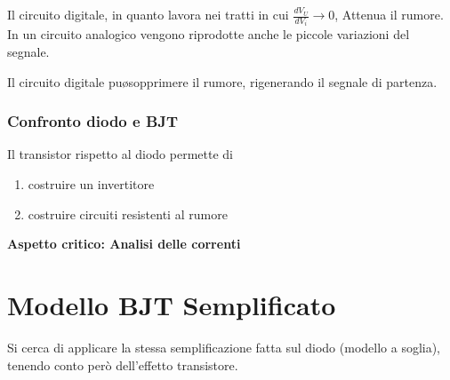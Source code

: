 \documentclass{article}
\begin{document}
Il circuito digitale, in quanto lavora nei tratti in cui $\frac{dV_U}{dV_i} \to 0$,  Attenua il rumore.
In un circuito analogico vengono riprodotte anche le piccole variazioni del segnale.


Il circuito digitale pu\o sopprimere il rumore, rigenerando il segnale di partenza.

\subsubsection{Confronto diodo e BJT}
Il transistor rispetto al diodo permette di
\begin{enumerate}
    \item costruire un invertitore
    \item costruire circuiti resistenti al rumore
\end{enumerate}

\textbf{Aspetto critico: Analisi delle correnti}

\section{Modello BJT Semplificato}
Si cerca di applicare la stessa semplificazione fatta sul diodo (modello a soglia), tenendo conto però dell'effetto transistore.
\end{document}
